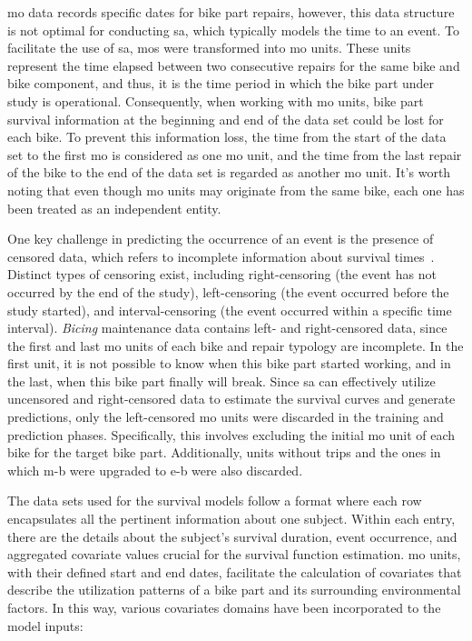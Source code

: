 \ac{mo} data records specific dates for bike part repairs, however, this data structure is not optimal for conducting \ac{sa}, which typically models the time to an event. To facilitate the use of \ac{sa}, \acp{mo} were transformed into \ac{mo} units. These units represent the time elapsed between two consecutive repairs for the same bike and bike component, and thus, it is the time period in which the bike part under study is operational. Consequently, when working with \ac{mo} units, bike part survival information at the beginning and end of the data set could be lost for each bike. To prevent this information loss, the time from the start of the data set to the first \ac{mo} is considered as one \ac{mo} unit, and the time from the last repair of the bike to the end of the data set is regarded as another \ac{mo} unit. It's worth noting that even though \ac{mo} units may originate from the same bike, each one has been treated as an independent entity.

One key challenge in predicting the occurrence of an event is the presence of censored data, which refers to incomplete information about survival times~\cite{Leung1997, Gijbels2010}. Distinct types of censoring exist, including right-censoring (the event has not occurred by the end of the study), left-censoring (the event occurred before the study started), and interval-censoring (the event occurred within a specific time interval). \textit{Bicing} maintenance data contains left- and right-censored data, since the first and last \ac{mo} units of each bike and repair typology are incomplete. In the first unit, it is not possible to know when this bike part started working, and in the last, when this bike part finally will break. Since \ac{sa} can effectively utilize uncensored and right-censored data to estimate the survival curves and generate predictions, only the left-censored \ac{mo} units were discarded in the training and prediction phases. Specifically, this involves excluding the initial \ac{mo} unit of each bike for the target bike part. Additionally, units without trips and the ones in which \ac{m-b} were upgraded to \ac{e-b} were also discarded.

The data sets used for the survival models follow a format where each row encapsulates all the pertinent information about one subject. Within each entry, there are the details about the subject's survival duration, event occurrence, and aggregated covariate values crucial for the survival function estimation. \ac{mo} units, with their defined start and end dates, facilitate the calculation of covariates that describe the utilization patterns of a bike part and its surrounding environmental factors. In this way, various covariates domains have been incorporated to the model inputs:

